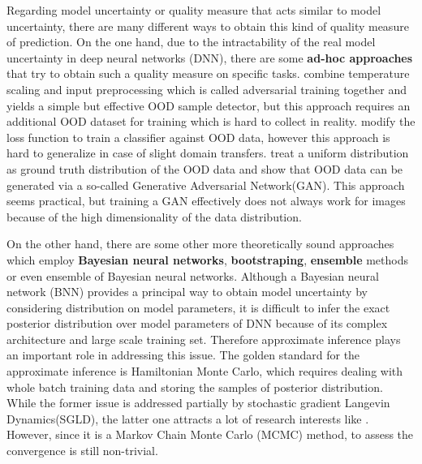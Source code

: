 Regarding model uncertainty or quality measure that acts similar to model uncertainty, there are many different ways to obtain this kind of quality measure of prediction. On the one hand, due to the intractability of the real model uncertainty in deep neural networks (DNN), there are some \textbf{ad-hoc approaches} that try to obtain such a quality measure on specific tasks.
\cite{liang2017enhancing} combine temperature scaling and input preprocessing which is called adversarial training together and yields a simple but effective OOD sample detector, but this approach requires an additional OOD dataset for training which is hard to collect in reality. \cite{devries2018learning} modify the loss function to train a classifier against OOD data, however this approach is hard to generalize in case of slight domain transfers. \cite{lee2017training} treat a uniform distribution as ground truth distribution of the OOD data and show that OOD data can be generated via a so-called Generative Adversarial Network(GAN). This approach seems practical, but training a GAN effectively does not always work for images because of the high dimensionality of the data distribution. 

On the other hand, there are some other more theoretically sound approaches which employ \textbf{Bayesian neural networks}\cite{mackay1992practical}\cite{neal2012bayesian}, \textbf{bootstraping}\cite{osband2016deep}, \textbf{ensemble} methods\cite{lakshminarayanan2017simple} or even ensemble of Bayesian neural networks\cite{smith2018understanding}. Although a Bayesian neural network (BNN) provides a principal way to obtain model uncertainty by considering distribution on model parameters, it is difficult to infer the exact posterior distribution over model parameters of DNN because of its complex architecture and large scale training set. Therefore approximate inference plays an important role in addressing this issue. The golden standard for the approximate inference is Hamiltonian Monte Carlo\cite{neal2012bayesian}, which requires dealing with whole batch training data and storing the samples of posterior distribution. While the former issue is addressed partially by stochastic gradient Langevin Dynamics\cite{welling2011bayesian}(SGLD), the latter one attracts a lot of research interests like \cite{balan2015bayesian}\cite{wang2018adversarial}. However, since it is a Markov Chain Monte Carlo (MCMC) method, to assess the convergence is still non-trivial.

